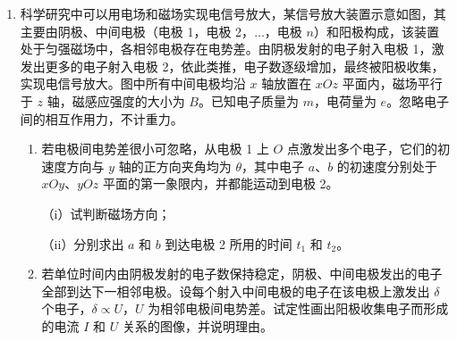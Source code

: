 \documentclass[\gkver]{gaokaozhenti}
\begin{document}
\begin{enumerate}

\item
科学研究中可以用电场和磁场实现电信号放大，某信号放大装置示意如图，其主要由阴极、中间电极（电极 1，电极 2，$\ldots$，电极 $n$）和阳极构成，该装置处于匀强磁场中，各相邻电极存在电势差。由阴极发射的电子射入电极 1，激发出更多的电子射入电极 2，依此类推，电子数逐级增加，最终被阳极收集，实现电信号放大。图中所有中间电极均沿 $x$ 轴放置在 $xOz$ 平面内，磁场平行于 $z$ 轴，磁感应强度的大小为 $B$。已知电子质量为 $m$，电荷量为 $e$。忽略电子间的相互作用力，不计重力。

\onepicture[w=11.21cm]{}

\begin{enumerate}
	\item
	若电极间电势差很小可忽略，从电极 1 上 $O$ 点激发出多个电子，它们的初速度方向与 $y$ 轴的正方向夹角均为 $\theta$，其中电子 $a$、$b$ 的初速度分别处于 $xOy$、$yOz$ 平面的第一象限内，并都能运动到电极 2。

	（i）试判断磁场方向；

	（ii）分别求出 $a$ 和 $b$ 到达电极 2 所用的时间 $t_{1}$ 和 $t_{2}$。
	\item
	若单位时间内由阴极发射的电子数保持稳定，阴极、中间电极发出的电子全部到达下一相邻电极。设每个射入中间电极的电子在该电极上激发出 $\delta$ 个电子，$\delta \propto U$，$U$ 为相邻电极间电势差。试定性画出阳极收集电子而形成的电流 $I$ 和 $U$ 关系的图像，并说明理由。
\end{enumerate}


\end{enumerate}
\end{document}
